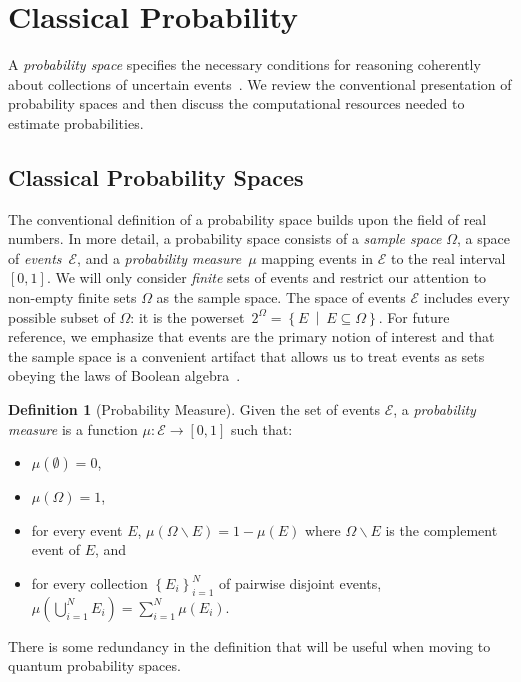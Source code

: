 \documentclass[12pt]{iopart}
\theoremstyle{plain}
\theoremstyle{definition}
\newtheorem{definition}[thm]{Definition}
\theoremstyle{remark}
\newcommand{\events}{\ensuremath{\mathcal{E}}}
\newcommand{\pmeas}{\ensuremath{\mu}}
\newcommand{\set}[2]{\ensuremath{\left\{ {#1}~\middle|~{#2}\right\} }}
\begin{document}
\section{Classical Probability}

A \emph{probability space} specifies the necessary conditions for
reasoning coherently about collections of uncertain
events~\cite{Kolmogorov1950,Shafer1976,Griffiths2003,Swart2013}.  We
review the conventional presentation of probability spaces and then
discuss the computational resources needed to estimate probabilities.

\subsection{Classical Probability Spaces}

The conventional definition of a probability space builds upon the
field of real numbers. In more detail, a probability space consists
of a \emph{sample space} $\Omega$, a space of \emph{events}~$\events$,
and a \emph{probability measure}~$\pmeas$ mapping events in $\events$
to the real interval $[0,1]$. We will only consider \emph{finite}
sets of events and restrict our attention to non-empty finite sets
$\Omega$ as the sample space. The space of events $\events$ includes
every possible subset of $\Omega$: it is the powerset~$2^{\Omega}=\set{E}{E\subseteq\Omega}$.
For future reference, we emphasize that events are the primary notion
of interest and that the sample space is a convenient artifact that
allows us to treat events as sets obeying the laws of Boolean algebra~\cite{Boole1948,Redhead1987-REDINA,Griffiths2003}.

\begin{definition}[Probability Measure]\label{def:ClassicalProbabilitySpace}
  Given the set of events $\events$, a \emph{probability measure} is a
  function $\pmeas:\events\rightarrow[0,1]$ such that:
\begin{itemize}
\item $\pmeas(\emptyset)=0$,
\item $\pmeas(\Omega)=1$, 
\item for every event $E$,
  $\pmeas\left(\Omega\backslash E\right)=1-\pmeas\left(E\right)$ where
  $\Omega\backslash E$ is the complement event of $E$, and
\item for every collection $\left\{ E_{i}\right\} _{i=1}^{N}$ of
  pairwise disjoint events,
  $\pmeas\left(\bigcup_{i=1}^{N}E_{i}\right)=\sum_{i=1}^{N}\pmeas(E_{i})$.
\end{itemize}
\end{definition}
\noindent There is some redundancy in the definition that will be useful when
moving to quantum probability spaces. 
\end{document}
